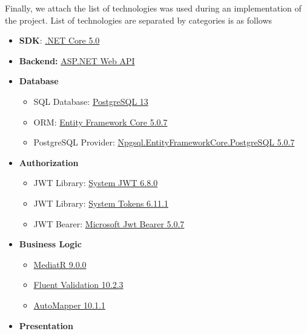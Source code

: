 Finally, we attach the list of technologies was used during an implementation of the project.
List of technologies are separated by categories is as follows
\begin{itemize}
    \item \textbf{SDK}: \href{https://dotnet.microsoft.com/download/dotnet/5.0}{.NET Core 5.0}
    \item \textbf{Backend:} \href{https://dotnet.microsoft.com/apps/aspnet}{ASP.NET Web API}
    \item \textbf{Database}
    \begin{itemize}
        \item SQL Database: \href{https://www.postgresql.org/}{PostgreSQL 13}
        \item ORM: \href{https://www.nuget.org/packages/Microsoft.EntityFrameworkCore/5.0.7?_src=template}{Entity Framework Core 5.0.7}
        \item PostgreSQL Provider: \href{https://www.nuget.org/packages/Npgsql.EntityFrameworkCore.PostgreSQL/5.0.7?_src=template}{Npgsql.EntityFrameworkCore.PostgreSQL 5.0.7}
    \end{itemize}
    \item \textbf{Authorization}
    \begin{itemize}
        \item JWT Library: \href{https://www.nuget.org/packages/System.IdentityModel.Tokens.Jwt}{System JWT 6.8.0}
        \item JWT Library: \href{https://www.nuget.org/packages/System.IdentityModel.Tokens}{System Tokens 6.11.1}
        \item JWT Bearer: \href{https://www.nuget.org/packages/Microsoft.AspNetCore.Authentication.JwtBearer/5.0.7?_src=template}{Microsoft Jwt Bearer 5.0.7}
    \end{itemize}
    \item \textbf{Business Logic}
    \begin{itemize}
        \item \href{https://www.nuget.org/packages/MediatR/9.0.0?_src=template}{MediatR 9.0.0}
        \item \href{https://www.nuget.org/packages/FluentValidation/10.2.3?_src=template}{Fluent Validation 10.2.3}
        \item \href{https://www.nuget.org/packages/AutoMapper/}{AutoMapper 10.1.1}
    \end{itemize}
    \item \textbf{Presentation}
    \begin{itemize}

\end{itemize}
\end{itemize}
